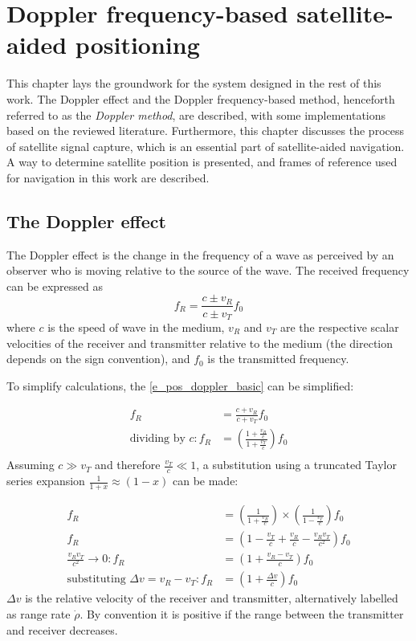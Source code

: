 \chapter{Doppler frequency-based satellite-aided positioning}
\label{s_pos}
This chapter lays the groundwork for the system designed in the rest of this work. The Doppler effect and the Doppler frequency-based method, henceforth referred to as the \textit{Doppler method}, are described, with some implementations based on the reviewed literature. Furthermore, this chapter discusses the process of satellite signal capture, which is an essential part of satellite-aided navigation. A way to determine satellite position is presented, and frames of reference used for navigation in this work are described. 



\section{The Doppler effect}
The Doppler effect is the change in the frequency of a wave as perceived by an observer who is moving relative to the source of the wave. The received frequency can be expressed as
\begin{equation}
    \label{e_pos_doppler_basic}
    f_R = \frac{c \pm v_R}{c \pm v_T} f_0
\end{equation}
 where $c$ is the speed of wave in the medium, $v_R$ and $v_T$ are the respective scalar velocities of the receiver and transmitter relative to the medium (the direction depends on the sign convention), and $f_0$ is the transmitted frequency. 

To simplify calculations, the \autoref{e_pos_doppler_basic} can be simplified:

\begin{align*}
    f_R &= \frac{c + v_R}{c + v_T} f_0 \\
    \text{dividing by } c: f_R & = (\frac{1 + \frac{v_R}{c}}{1 + \frac{v_T}{c}}) f_0 \\
\end{align*}
Assuming $c \gg v_T$ and therefore $\frac{v_T}{c} \ll 1$, a substitution using a truncated Taylor series expansion $\frac{1}{1 + x} \approx (1 - x)$ can be made:

\begin{align}
    f_R &= \left( \frac{1}{1 + \frac{v_R}{c}} \right) \times \left( \frac{1}{1 - \frac{v_T}{c}} \right) f_0 \nonumber \\
    f_R &= \left( 1 - \frac{v_T}{c} + \frac{v_R}{c} - \frac{v_R v_T}{c^2} \right) f_0 \nonumber \\
    \frac{v_R v_T}{c^2} \rightarrow 0: f_R &= \left( 1 + \frac{v_R - v_T}{c} \right) f_0 \nonumber \\
    \text{substituting } \Delta v = v_R - v_T: f_R &= \left( 1 + \frac{\Delta v}{c} \right) f_0 \label{e_pos_dopp_fr}
\end{align}
$\Delta v$ is the relative velocity of the receiver and transmitter, alternatively labelled as range rate $\dot\rho$. By convention it is positive if the range between the transmitter and receiver decreases.

